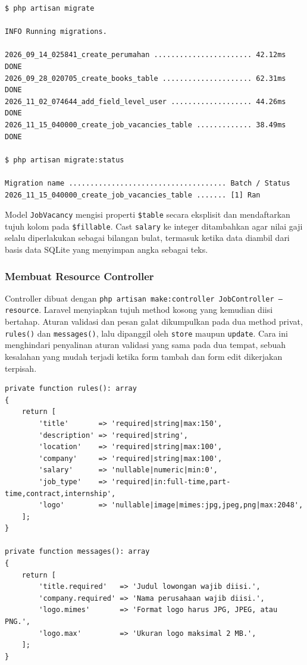\documentclass[12pt,a4paper]{article}
\begin{document}
\newpage
\begin{lstlisting}[caption={Keluaran perintah migrasi dan status tabel pada terminal}, label={lst:migrate}, language={}]
$ php artisan migrate

INFO Running migrations.

2026_09_14_025841_create_perumahan ....................... 42.12ms DONE
2026_09_28_020705_create_books_table ..................... 62.31ms DONE
2026_11_02_074644_add_field_level_user ................... 44.26ms DONE
2026_11_15_040000_create_job_vacancies_table ............. 38.49ms DONE

$ php artisan migrate:status

Migration name ..................................... Batch / Status
2026_11_15_040000_create_job_vacancies_table ....... [1] Ran
\end{lstlisting}

Model \texttt{JobVacancy} mengisi properti \texttt{\$table} secara eksplisit dan mendaftarkan tujuh kolom pada \texttt{\$fillable}. Cast \texttt{salary} ke integer ditambahkan agar nilai gaji selalu diperlakukan sebagai bilangan bulat, termasuk ketika data diambil dari basis data SQLite yang menyimpan angka sebagai teks.

\subsubsection{Membuat Resource Controller}

Controller dibuat dengan \texttt{php artisan make:controller JobController --resource}. Laravel menyiapkan tujuh method kosong yang kemudian diisi bertahap. Aturan validasi dan pesan galat dikumpulkan pada dua method privat, \texttt{rules()} dan \texttt{messages()}, lalu dipanggil oleh \texttt{store} maupun \texttt{update}. Cara ini menghindari penyalinan aturan validasi yang sama pada dua tempat, sebuah kesalahan yang mudah terjadi ketika form tambah dan form edit dikerjakan terpisah.

\begin{lstlisting}[caption={Aturan validasi dan pesan galat pada \texttt{JobController}}, label={lst:validasi}]
private function rules(): array
{
    return [
        'title'       => 'required|string|max:150',
        'description' => 'required|string',
        'location'    => 'required|string|max:100',
        'company'     => 'required|string|max:100',
        'salary'      => 'nullable|numeric|min:0',
        'job_type'    => 'required|in:full-time,part-time,contract,internship',
        'logo'        => 'nullable|image|mimes:jpg,jpeg,png|max:2048',
    ];
}

private function messages(): array
{
    return [
        'title.required'   => 'Judul lowongan wajib diisi.',
        'company.required' => 'Nama perusahaan wajib diisi.',
        'logo.mimes'       => 'Format logo harus JPG, JPEG, atau PNG.',
        'logo.max'         => 'Ukuran logo maksimal 2 MB.',
    ];
}
\end{lstlisting}
\end{document}

